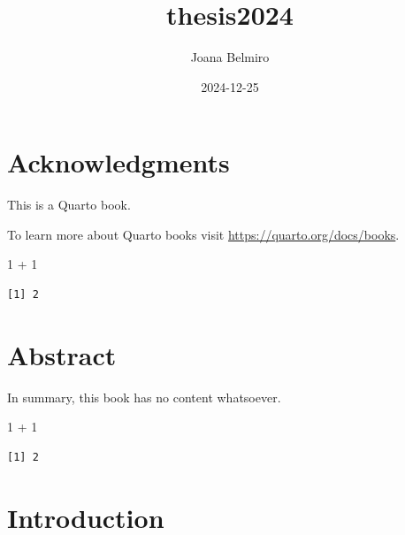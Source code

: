 \documentclass[
  a4paper,
  DIV=11,
  numbers=noendperiod]{scrreprt}
\title{thesis2024}
\author{Joana Belmiro}
\date{2024-12-25}
\newenvironment{Shaded}{\begin{snugshade}}{\end{snugshade}}
\newcommand{\DecValTok}[1]{\textcolor[rgb]{0.68,0.00,0.00}{#1}}
\newcommand{\SpecialCharTok}[1]{\textcolor[rgb]{0.37,0.37,0.37}{#1}}
\renewcommand*\contentsname{Table of contents}
\newcommand\contentsname{Table of contents}
\begin{document}
\maketitle

\renewcommand*\contentsname{Table of contents}
{
\hypersetup{linkcolor=}
\setcounter{tocdepth}{2}
\tableofcontents
}
\listoffigures
\listoftables


\chapter*{Acknowledgments}\label{acknowledgments}


This is a Quarto book.

To learn more about Quarto books visit
\url{https://quarto.org/docs/books}.

\begin{Shaded}
\begin{Highlighting}[]
\DecValTok{1} \SpecialCharTok{+} \DecValTok{1}
\end{Highlighting}
\end{Shaded}

\begin{verbatim}
[1] 2
\end{verbatim}


\chapter{Abstract}\label{abstract}

In summary, this book has no content whatsoever.

\begin{Shaded}
\begin{Highlighting}[]
\DecValTok{1} \SpecialCharTok{+} \DecValTok{1}
\end{Highlighting}
\end{Shaded}

\begin{verbatim}
[1] 2
\end{verbatim}


\chapter{Introduction}\label{introduction}
\end{document}
